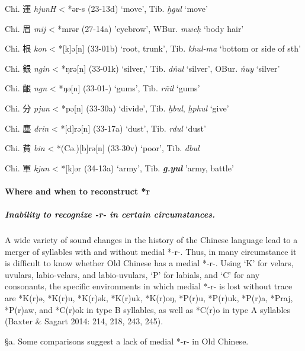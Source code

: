 \begin{description} \item
Chi. 運 \emph{hjunH} \textless{} *{}ər-s 
(23-13d) `move', Tib. {} \emph{ḫgul}
`move'
\item
Chi. 眉 \emph{mij} \textless{} *mrər 
(27-14a)
'eyebrow', WBur. {} \emph{mweḥ} 
`body hair'
\item
Chi. 根 \emph{kon} \textless{} *[k]{}ə[n] 
(33-01b) `root, trunk', Tib. {} \emph{khul-ma}
`bottom or side of sth'
\item
Chi. 銀 \emph{ngin} \textless{} *ŋrə[n]
(33-01k) `silver,' Tib. {} \emph{dṅul}
`silver', OBur. {} \emph{ṅuy}
`silver'
\item
Chi. 齦 \emph{ng{}n} \textless{} *ŋə[n] 
(33-01-) `gums', Tib. {} \emph{rñil}
`gums'
\item
Chi. 分 \emph{pjun} \textless{} *pə[n] 
(33-30a) `divide', Tib. {} \emph{ḫbul},
{} \emph{ḫphul} `give'
\item
Chi. 塵 \emph{drin} \textless{} *[d]rə[n] 
(33-17a) `dust', Tib. {} \emph{rdul}  `dust'
\item
Chi. 貧 \emph{bin} \textless{} *(Cə.){[}b]rə[n]
(33-30v) `poor', Tib. {} \emph{dbul}
\item
Chi. 軍 \emph{kjun} \textless{}
*[k]{}ər 
(34-13a) `army', Tib.
 {} \emph{\textbf{g.yul}}
'army, battle'
\end{description}


\paragraph{Where and when to reconstruct *r}

\subparagraph{Inability to recognize -r- in
certain circumstances.} A wide variety of sound changes in the
history of the Chinese language lead to a merger of syllables with and
without medial *-r-. Thus, in many circumstance it is difficult to know
whether Old Chinese has a medial *-r-. Using `K' for velars, uvulars,
labio-velars, and labio-uvulars, `P' for labials, and `C' for any
consonants, the specific environments in which medial *-r- is lost
without trace are *K(r)ə, *K(r)u, *K(r)ək, *K(r)uk, *K(r)oŋ, *P(r)u,
*P(r)uk, *P(r)a, *Praj, *P(r)aw, and *C(r)ok in type B syllables, as
well as *C{}(r)o in type A syllables (Baxter \& Sagart 2014: 214, 218,
243, 245).

§a. Some comparisons suggest a lack of medial *-r- in Old Chinese.

